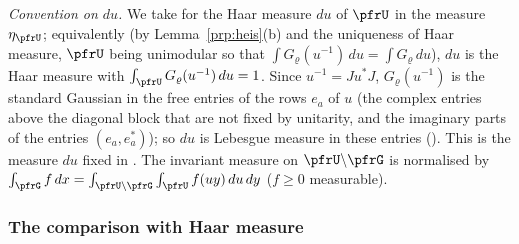 \documentclass[10pt]{amsart}
\theoremstyle{definition}
\theoremstyle{remark}
\begin{document}
\emph{Convention on $du$.} We take for the Haar measure $du$ of $\pfrU$ in {\cite[\S3.2.1]{P51}} the measure
$\eta_\pfrU$; equivalently (by Lemma~\ref{prp:heis}(b) and the uniqueness of Haar measure, $\pfrU$ being
unimodular so that $\int G_\varrho(u^{-1})\,du=\int G_\varrho\,du$), $du$ is the Haar measure with
$\int_\pfrU G_\varrho(u^{-1})\,du=1$. Since $u^{-1}=Ju^*J$, $G_\varrho(u^{-1})$ is the standard Gaussian in the
free entries of the rows $e_a$ of $u$ (the complex entries above the diagonal block that are not fixed by
unitarity, and the imaginary parts of the entries $(e_a,e_a^*)$); so $du$ is Lebesgue measure in these
entries ({\cite[Lemma~3.6]{P51}}). This is the measure $du$ fixed in {\cite[\S2.1]{P51}}. The invariant measure on $\pfrU\backslash\pfrG$ is
normalised by $\int_\pfrG f\,dx=\int_{\pfrU\backslash\pfrG}\int_\pfrU f(uy)\,du\,dy$ ($f\ge0$ measurable).

\subsubsection*{The comparison with Haar measure}
\end{document}
